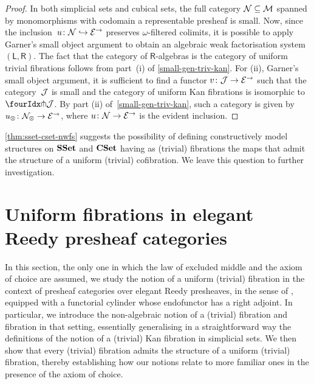 \documentclass[reqno,10pt,a4paper,oneside,draft]{amsart}
\begin{document}
\begin{proof} In both simplicial sets and cubical sets, the full category $\cal{N} \subseteq \cal{M}$ spanned by monomorphisms with codomain a representable presheaf is small.
Now, since the inclusion~$u \co \cal{N} \hookrightarrow \catE^\to$ preserves $\omega$-filtered colimits, it is possible to apply Garner's small object argument to obtain an algebraic weak factorisation system $(\mathsf{L}, \mathsf{R})$.
The fact that the category of $\mathsf{R}$-algebras is the category of uniform trivial fibrations follows from part~(i) of \cref{small-gen-triv-kan}.
For (ii), Garner's small object argument, it is sufficient to find a functor $v \co \cal{J} \rightarrow \catE^\to$ such that the category~$\cal{J}$ is small and the category of uniform Kan fibrations is isomorphic to~$\liftr{\cal{J}}$.
By part (ii) of~\cref{small-gen-triv-kan}, such a category is given by $u_\otimes \co \cal{N}_\otimes \rightarrow \catE^\to$, where $u \co \cal{N} \to \cal{E}^\to$ is the evident inclusion.
\end{proof}

\cref{thm:sset-cset-nwfs} suggests the possibility of defining constructively model structures on $\SSet$ and $\CSet$ having as (trivial) fibrations the maps that admit the structure of a uniform (trivial) cofibration.
We leave this question to further investigation.



\section{Uniform fibrations in elegant Reedy presheaf categories}

In this section, the only one in which the law of excluded middle and the axiom of choice are assumed, we study the notion of a uniform (trivial) fibration in the context of presheaf categories over elegant Reedy presheaves, in the sense of \cite{bergner-rezk-elegant}, equipped with a functorial cylinder whose endofunctor has a right adjoint.
In particular, we introduce the non-algebraic notion of a (trivial) fibration and fibration in that setting, essentially generalising in a straightforward way the definitions of the notion of a (trivial) Kan fibration in simplicial sets.
We then show that every (trivial) fibration admits the structure of a uniform (trivial) fibration, thereby establishing how our notions relate to more familiar ones in the presence of the axiom of choice.

\medskip
\end{document}
